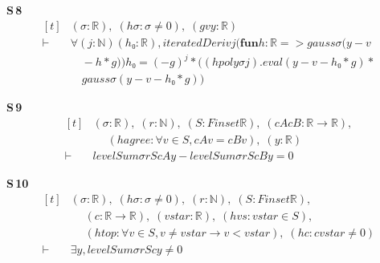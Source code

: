 \noindent\textbf{S\,8}\quad{}
{\footnotesize\[ \begin{aligned}[t]
&(\sigma : \mathbb{R} ),\; (\mathit{hσ} : \sigma \neq 0),\; (\mathit{g} \mathit{v} \mathit{y} : \mathbb{R} )\\
\vdash\;&\forall (\mathit{j} : \mathbb{N} ) (\mathit{h₀} : \mathbb{R} ), \mathit{iteratedDeriv} \mathit{j} (\mathbf{fun} \mathit{h} : \mathbb{R} => \mathit{gauss} \sigma (\mathit{y} - \mathit{v}\\
&\quad - \mathit{h} * \mathit{g})) \mathit{h₀} = (-\mathit{g}) ^{\mathit{j}} * ((\mathit{hpoly} \sigma \mathit{j}).\mathit{eval} (\mathit{y} - \mathit{v} - \mathit{h₀} * \mathit{g}) *\\
&\quad \mathit{gauss} \sigma (\mathit{y} - \mathit{v} - \mathit{h₀} * \mathit{g}))
\end{aligned} \]}

\noindent\textbf{S\,9}\quad{}
{\footnotesize\[ \begin{aligned}[t]
&(\sigma : \mathbb{R} ),\; (\mathit{r} : \mathbb{N} ),\; (\mathit{S} : \mathit{Finset} \mathbb{R} ),\; (\mathit{cA} \mathit{cB} : \mathbb{R} \to \mathbb{R} ),\\
&\quad \; (\mathit{hagree} : \forall \mathit{v} \in \mathit{S}, \mathit{cA} \mathit{v} = \mathit{cB} \mathit{v}),\; (\mathit{y} : \mathbb{R} )\\
\vdash\;&\mathit{levelSum} \sigma \mathit{r} \mathit{S} \mathit{cA} \mathit{y} - \mathit{levelSum} \sigma \mathit{r} \mathit{S} \mathit{cB} \mathit{y} = 0
\end{aligned} \]}

\noindent\textbf{S\,10}\quad{}
{\footnotesize\[ \begin{aligned}[t]
&(\sigma : \mathbb{R} ),\; (\mathit{hσ} : \sigma \neq 0),\; (\mathit{r} : \mathbb{N} ),\; (\mathit{S} : \mathit{Finset} \mathbb{R} ),\\
&\quad \; (\mathit{c} : \mathbb{R} \to \mathbb{R} ),\; (\mathit{vstar} : \mathbb{R} ),\; (\mathit{hvs} : \mathit{vstar} \in \mathit{S}),\\
&\quad \; (\mathit{htop} : \forall \mathit{v} \in \mathit{S}, \mathit{v} \neq \mathit{vstar} \to \mathit{v} < \mathit{vstar}),\; (\mathit{hc} : \mathit{c} \mathit{vstar} \neq 0)\\
\vdash\;&\exists \mathit{y}, \mathit{levelSum} \sigma \mathit{r} \mathit{S} \mathit{c} \mathit{y} \neq 0
\end{aligned} \]}


